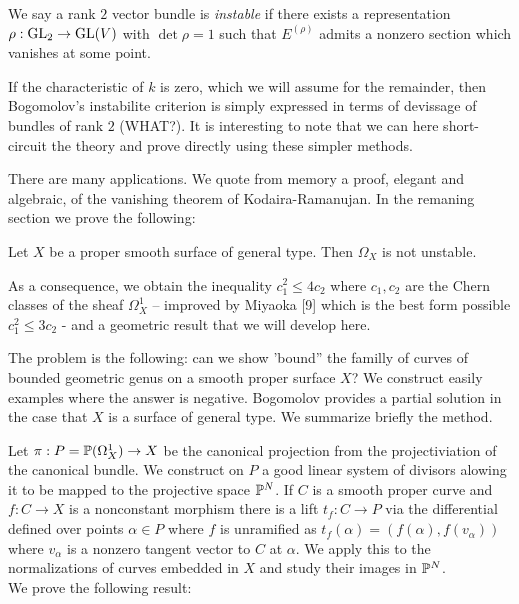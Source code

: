 \documentclass[12pt]{article}
\begin{document}
\begin{defn}
We say a rank $2$ vector bundle is \textit{instable} if there exists a representation $\rho : \GL_2 \to \GL(V)$ with $\det{\rho} = 1$ such that $E^{(\rho)}$ admits a nonzero section which vanishes at some point. 
\end{defn}

If the characteristic of $k$ is zero, which we will assume for the remainder, then Bogomolov's instabilite criterion is simply expressed in terms of devissage of bundles of rank $2$ (WHAT?). It is interesting to note that we can here short-circuit the theory and prove directly using these simpler methods. 
\par
There are many applications. We quote from memory a proof, elegant and algebraic, of the vanishing theorem of Kodaira-Ramanujan. In the remaning section we prove the following:

\begin{theorem}[0.3]
Let $X$ be a proper smooth surface of general type. Then $\Omega_X$ is not unstable.
\end{theorem}

As a consequence, we obtain the inequality $c_1^2 \le 4 c_2$ where $c_1, c_2$ are the Chern classes of the sheaf $\Omega_X^1$ -- improved by Miyaoka [9] which is the best form possible $c_1^2 \le 3 c_2$ - and a geometric result that we will develop here.
\par 
The problem is the following: can we show 'bound'' the familly of curves of bounded geometric genus on a smooth proper surface $X$? We construct easily examples where the answer is negative. Bogomolov provides a partial solution in the case that $X$ is a surface of general type. We summarize briefly the method.
\par 
Let $\pi : P = \P(\Omega_X^1) \to X$ be the canonical projection from the projectiviation of the canonical bundle. We construct on $P$ a good linear system of divisors alowing it to be mapped to the projective space $\P^N$. If $C$ is a smooth proper curve and $f: C \to X$ is a nonconstant morphism there is a lift $t_f : C \to P$ via the differential defined over points $\alpha \in P$ where $f$ is unramified as $t_f(\alpha) = (f(\alpha), f(v_\alpha))$ where $v_\alpha$ is a nonzero tangent vector to $C$ at $\alpha$. We apply this to the normalizations of curves embedded in $X$ and study their images in $\P^N$.
\bigskip\\
We prove the following result:
\end{document}

